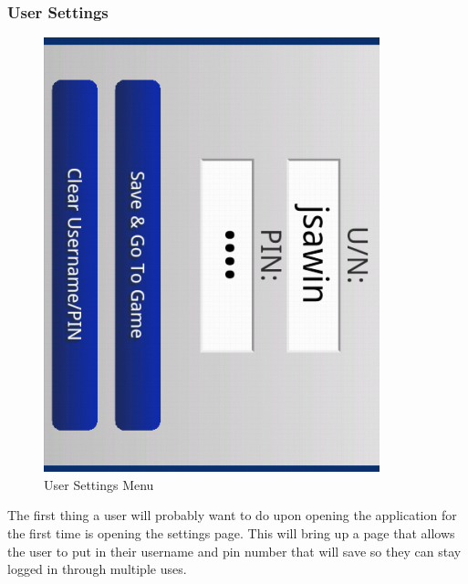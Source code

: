 \documentclass[12pt]{article}
\begin{document}
\subsubsection{User Settings}
\begin{figure}
\begin{center}
\includegraphics[scale=.7]{userNamePinSave.png}
\caption{\label{User Setting Interface}User Settings Menu}
\end{center}
\end{figure}

The first thing a user will probably want to do upon opening the application for the first time is opening the settings page. This will bring up a page that allows the user to put in their username and pin number that will save so they can stay logged in through multiple uses.
\end{document}
